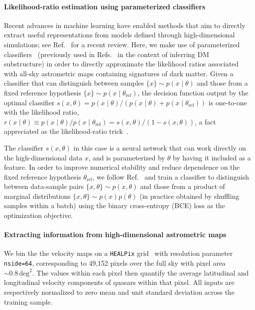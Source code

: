 \documentclass[preprint]{article}
\begin{document}
\paragraph{Likelihood-ratio estimation using parameterized classifiers} Recent advances in machine learning have enabled methods that aim to directly extract useful representations from models defined through high-dimensional simulations; see Ref.~\cite{Cranmer:2019eaq} for a recent review. Here, we make use of parameterized classifiers~\cite{Cranmer:2015bka,Baldi:2016fzo,Brehmer:2018eca,Brehmer:2018hga,Brehmer:2018kdj,Hermans:2019ioj} (previously used in Refs.~\cite{Brehmer:2019jyt,Hermans:2020skz} in the context of inferring DM substructure) in order to directly approximate the likelihood ratios associated with all-sky astrometric maps containing signatures of dark matter. Given a classifier that can distinguish between samples $\{x\} \sim p(x\mid\theta)$ and those from a fixed reference hypothesis $\{x\} \sim p(x\mid\theta_\mathrm{ref})$, the decision function output by the optimal classifier $s(x, \theta) = {p(x\mid\theta)}/{\left(p(x\mid\theta) + p(x\mid\theta_\mathrm{ref})\right)}$ is one-to-one with the likelihood ratio, $r(x\mid \theta) \equiv {p(x\mid\theta)}/{p(x\mid\theta_\mathrm{ref})}  = {s(x, \theta)}/{\left(1 - s(x, \theta)\right)}$, a fact appreciated as the likelihood-ratio trick~\cite{Cranmer:2015bka,mohamed2017learning}. 

The classifier $s(x, \theta)$ in this case is a neural network that can work directly on the high-dimensional data $x$, and is parameterized by $\theta$ by having it included as a feature. In order to improve numerical stability and reduce dependence on the fixed reference hypothesis $\theta_\mathrm{ref}$, we follow Ref.~\cite{Hermans:2019ioj} and train a classifier to distinguish between data-sample pairs $\{x, \theta\} \sim p(x,\theta)$ and those from a product of marginal distributions $\{x, \theta\} \sim p(x)p(\theta)$ (in practice obtained by shuffling samples within a batch) using the binary cross-entropy (BCE) loss as the optimization objective. 

\paragraph{Extracting information from high-dimensional astrometric maps} We bin the the velocity maps on a \texttt{HEALPix} grid~\cite{Gorski:2004by} with resolution parameter \texttt{nside=64}, corresponding to 49,152 pixels over the full sky with pixel area $\sim 0.8\,\mathrm{deg}^2$. The values within each pixel then quantify the average latitudinal and longitudinal velocity components of quasars within that pixel. All inputs are respectively normalized to zero mean and unit standard deviation across the training sample. 
\end{document}
